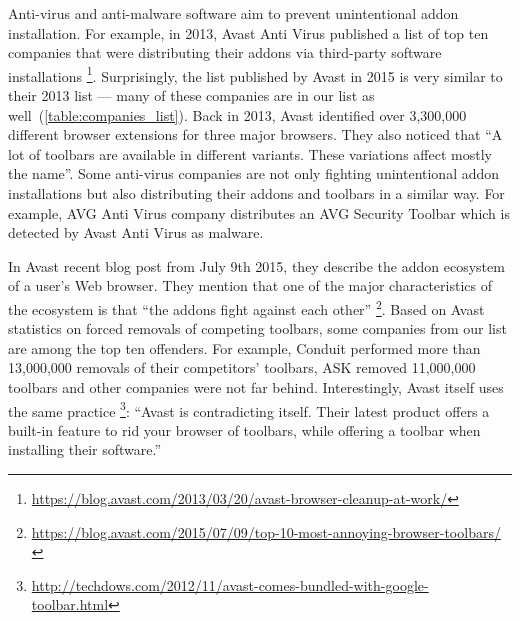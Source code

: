 \documentclass[11pt,oneside]{book}
\begin{document}
Anti-virus and anti-malware software aim to prevent unintentional addon installation. For example, in 2013, Avast Anti Virus published a list of top ten companies that were distributing their addons via third-party software installations \footnote{\url{https://blog.avast.com/2013/03/20/avast-browser-cleanup-at-work/}}. Surprisingly, the list published by Avast in 2015 is very similar to their 2013 list --- many of these companies are in our list as well~(\autoref{table:companies_list}). Back in 2013, Avast identified over 3,300,000 different browser extensions for three major browsers. They also noticed that ``A lot of toolbars are available in different variants. These variations affect mostly the name''. Some anti-virus companies are not only fighting unintentional addon installations but also distributing their addons and toolbars in a similar way. For example, AVG Anti Virus company distributes an AVG Security Toolbar which is detected by Avast Anti Virus as malware. 

In Avast recent blog post from July 9th 2015, they describe the addon ecosystem of a user's Web browser. They mention that one of the major characteristics of the ecosystem is that ``the addons fight against each other'' \footnote{\url{https://blog.avast.com/2015/07/09/top-10-most-annoying-browser-toolbars/}}.
Based on Avast statistics on forced removals of competing toolbars, some companies from our list are among the top ten offenders. For example, Conduit performed more than 13,000,000 removals of their competitors' toolbars, ASK removed 11,000,000 toolbars and other companies were not far behind. Interestingly, Avast itself uses the same practice \footnote{\url{http://techdows.com/2012/11/avast-comes-bundled-with-google-toolbar.html}}: ``Avast is contradicting itself. Their latest product offers a built-in feature to rid your browser of toolbars, while offering a toolbar when installing their software.''
\end{document}
